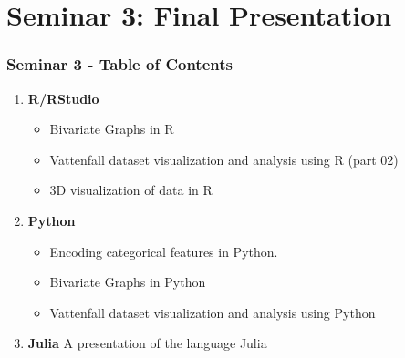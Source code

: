 \documentclass{beamer}
\begin{document}





\section{Seminar 3: Final Presentation}

\begin{frame}[fragile] %
\frametitle{Seminar 3 - Table of Contents}


\begin{enumerate}
\footnotesize\item \textbf{R/RStudio}

\begin{itemize}
\item Bivariate Graphs in R
\item Vattenfall dataset visualization and analysis using R (part 02)
\item 3D visualization of data in R


\end{itemize}

\item \textbf{Python}
\begin{itemize}
\item Encoding categorical features in Python.
\item Bivariate Graphs in Python 
\item Vattenfall dataset visualization and analysis using Python
\end{itemize}

\item \textbf{Julia}\newline
A presentation of the language Julia

\end{enumerate}

\end{frame}
\end{document}

